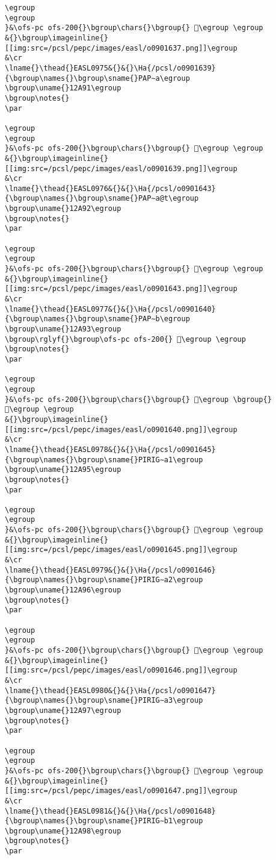 \begin{verbatim}
\egroup
\egroup
}&\ofs-pc ofs-200{}\bgroup\chars{}\bgroup{} 𒪐\egroup \egroup
&{}\bgroup\imageinline{}[[img:src=/pcsl/pepc/images/easl/o0901637.png]]\egroup
&\cr
\lname{}\thead{}EASL0975&{}&{}\Ha{/pcsl/o0901639}{\bgroup\names{}\bgroup\sname{}PAP∼a\egroup
\bgroup\uname{}12A91\egroup
\bgroup\notes{}
\par 

\egroup
\egroup
}&\ofs-pc ofs-200{}\bgroup\chars{}\bgroup{} 𒪑\egroup \egroup
&{}\bgroup\imageinline{}[[img:src=/pcsl/pepc/images/easl/o0901639.png]]\egroup
&\cr
\lname{}\thead{}EASL0976&{}&{}\Ha{/pcsl/o0901643}{\bgroup\names{}\bgroup\sname{}PAP∼a@t\egroup
\bgroup\uname{}12A92\egroup
\bgroup\notes{}
\par 

\egroup
\egroup
}&\ofs-pc ofs-200{}\bgroup\chars{}\bgroup{} 𒪒\egroup \egroup
&{}\bgroup\imageinline{}[[img:src=/pcsl/pepc/images/easl/o0901643.png]]\egroup
&\cr
\lname{}\thead{}EASL0977&{}&{}\Ha{/pcsl/o0901640}{\bgroup\names{}\bgroup\sname{}PAP∼b\egroup
\bgroup\uname{}12A93\egroup
\bgroup\rglyf{}\bgroup\ofs-pc ofs-200{} 𒪓\egroup \egroup
\bgroup\notes{}
\par 

\egroup
\egroup
}&\ofs-pc ofs-200{}\bgroup\chars{}\bgroup{} 𒪓\egroup \bgroup{} 𒪔\egroup \egroup
&{}\bgroup\imageinline{}[[img:src=/pcsl/pepc/images/easl/o0901640.png]]\egroup
&\cr
\lname{}\thead{}EASL0978&{}&{}\Ha{/pcsl/o0901645}{\bgroup\names{}\bgroup\sname{}PIRIG∼a1\egroup
\bgroup\uname{}12A95\egroup
\bgroup\notes{}
\par 

\egroup
\egroup
}&\ofs-pc ofs-200{}\bgroup\chars{}\bgroup{} 𒪕\egroup \egroup
&{}\bgroup\imageinline{}[[img:src=/pcsl/pepc/images/easl/o0901645.png]]\egroup
&\cr
\lname{}\thead{}EASL0979&{}&{}\Ha{/pcsl/o0901646}{\bgroup\names{}\bgroup\sname{}PIRIG∼a2\egroup
\bgroup\uname{}12A96\egroup
\bgroup\notes{}
\par 

\egroup
\egroup
}&\ofs-pc ofs-200{}\bgroup\chars{}\bgroup{} 𒪖\egroup \egroup
&{}\bgroup\imageinline{}[[img:src=/pcsl/pepc/images/easl/o0901646.png]]\egroup
&\cr
\lname{}\thead{}EASL0980&{}&{}\Ha{/pcsl/o0901647}{\bgroup\names{}\bgroup\sname{}PIRIG∼a3\egroup
\bgroup\uname{}12A97\egroup
\bgroup\notes{}
\par 

\egroup
\egroup
}&\ofs-pc ofs-200{}\bgroup\chars{}\bgroup{} 𒪗\egroup \egroup
&{}\bgroup\imageinline{}[[img:src=/pcsl/pepc/images/easl/o0901647.png]]\egroup
&\cr
\lname{}\thead{}EASL0981&{}&{}\Ha{/pcsl/o0901648}{\bgroup\names{}\bgroup\sname{}PIRIG∼b1\egroup
\bgroup\uname{}12A98\egroup
\bgroup\notes{}
\par 


\end{verbatim}
